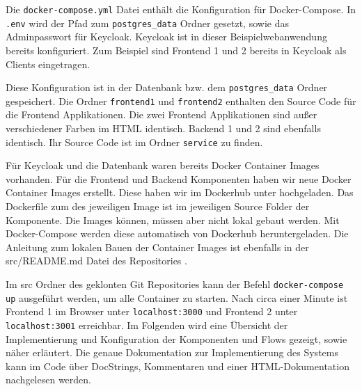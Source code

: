 Die \texttt{docker-compose.yml} Datei enthält die Konfiguration für Docker-Compose. In \texttt{.env} wird der Pfad zum \texttt{postgres\_data} Ordner gesetzt, sowie das Adminpasswort für Keycloak. Keycloak ist in dieser Beispielwebanwendung bereits konfiguriert. Zum Beispiel sind Frontend 1 und 2 bereits in Keycloak als Clients eingetragen. 

Diese Konfiguration ist in der Datenbank bzw. dem \texttt{postgres\_data} Ordner gespeichert. Die Ordner \texttt{frontend1} und \texttt{frontend2} enthalten den Source Code für die Frontend Applikationen. Die zwei Frontend Applikationen sind außer verschiedener Farben im HTML identisch. Backend 1 und 2 sind ebenfalls identisch. Ihr Source Code ist im Ordner \texttt{service} zu finden.

Für Keycloak und die Datenbank waren bereits Docker Container Images vorhanden. Für die Frontend und Backend Komponenten haben wir neue Docker Container Images erstellt. Diese haben wir im Dockerhub unter \cite{EB42} hochgeladen. Das Dockerfile zum des jeweiligen Image ist im jeweiligen Source Folder der Komponente. Die Images können, müssen aber nicht lokal gebaut werden. Mit Docker-Compose werden diese automatisch von Dockerhub heruntergeladen. Die Anleitung zum lokalen Bauen der Container Images ist ebenfalls in der src/README.md Datei des Repositories \cite{SSEB2}.

Im src Ordner des geklonten Git Repositories \cite{SSEB1} kann der Befehl \texttt{docker-compose up} ausgeführt werden, um alle Container zu starten. Nach circa einer Minute ist Frontend 1 im Browser unter \texttt{localhost:3000} und Frontend 2 unter \texttt{localhost:3001} erreichbar. Im Folgenden wird eine Übersicht der Implementierung und Konfiguration der Komponenten und Flows gezeigt, sowie näher erläutert. Die genaue Dokumentation zur Implementierung des Systems kann im Code über DocStrings, Kommentaren und einer HTML-Dokumentation nachgelesen werden.


